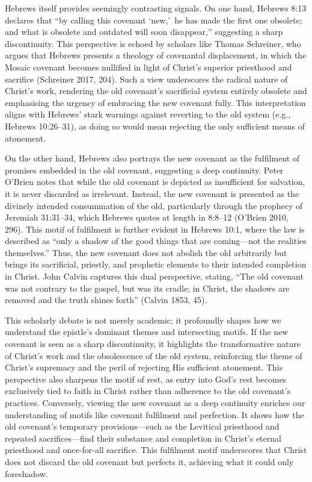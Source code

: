 \documentclass[12pt]{article}
\begin{document}
Hebrews itself provides seemingly contrasting signals. On one hand, Hebrews 8:13
declares that ``by calling this covenant \lq{}new,\rq\ he has made the first one
obsolete; and what is obsolete and outdated will soon disappear,'' suggesting a
sharp discontinuity. This perspective is echoed by scholars like Thomas
Schreiner, who argues that Hebrews presents a theology of covenantal
displacement, in which the Mosaic covenant becomes nullified in light of
Christ’s superior priesthood and sacrifice (Schreiner 2017, 204). Such a view
underscores the radical nature of Christ’s work, rendering the old covenant’s
sacrificial system entirely obsolete and emphasising the urgency of embracing
the new covenant fully. This interpretation aligns with Hebrews’ stark warnings
against reverting to the old system (e.g., Hebrews 10:26--31), as doing so would
mean rejecting the only sufficient means of atonement.

On the other hand, Hebrews also portrays the new covenant as the fulfilment of
promises embedded in the old covenant, suggesting a deep continuity. Peter
O’Brien notes that while the old covenant is depicted as insufficient for
salvation, it is never discarded as irrelevant. Instead, the new covenant is
presented as the divinely intended consummation of the old, particularly through
the prophecy of Jeremiah 31:31--34, which Hebrews quotes at length in 8:8--12
(O’Brien 2010, 296). This motif of fulfilment is further evident in Hebrews
10:1, where the law is described as ``only a shadow of the good things that are
coming---not the realities themselves.'' Thus, the new covenant does not abolish
the old arbitrarily but brings its sacrificial, priestly, and prophetic elements
to their intended completion in Christ. John Calvin captures this dual
perspective, stating, ``The old covenant was not contrary to the gospel, but was
its cradle; in Christ, the shadows are removed and the truth shines forth''
(Calvin 1853, 45).

This scholarly debate is not merely academic; it profoundly shapes how we
understand the epistle’s dominant themes and intersecting motifs. If the new
covenant is seen as a sharp discontinuity, it highlights the transformative
nature of Christ’s work and the obsolescence of the old system, reinforcing the
theme of Christ’s supremacy and the peril of rejecting His sufficient atonement.
This perspective also sharpens the motif of rest, as entry into God’s rest
becomes exclusively tied to faith in Christ rather than adherence to the old
covenant’s practices. Conversely, viewing the new covenant as a deep continuity
enriches our understanding of motifs like covenant fulfilment and perfection. It
shows how the old covenant’s temporary provisions—such as the Levitical
priesthood and repeated sacrifices—find their substance and completion in
Christ’s eternal priesthood and once-for-all sacrifice. This fulfilment motif
underscores that Christ does not discard the old covenant but perfects it,
achieving what it could only foreshadow.
\end{document}
